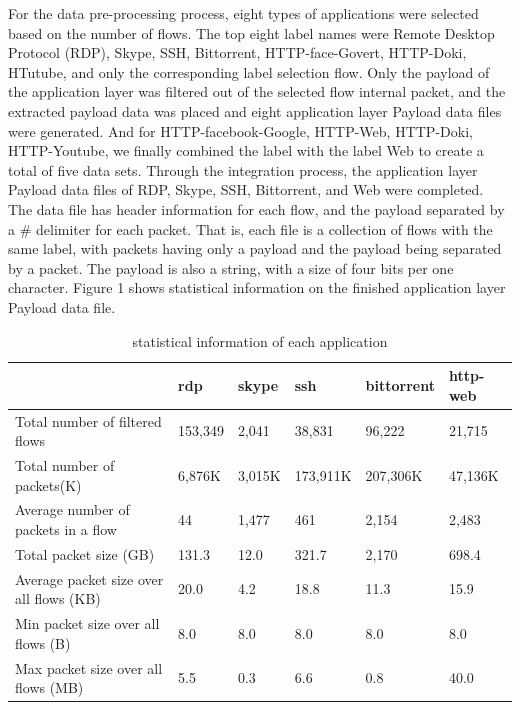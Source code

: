 \documentclass[10pt, twoside, jounal]{IEEEtran}
\begin{document}
For the data pre-processing process, eight types of applications were selected based on the number of flows. The top eight label names were Remote Desktop Protocol (RDP), Skype, SSH, Bittorrent, HTTP-face-Govert, HTTP-Doki, HTutube, and only the corresponding label selection flow.
Only the payload of the application layer was filtered out of the selected flow internal packet, and the extracted payload data was placed  and eight application layer Payload data files were generated. And for HTTP-facebook-Google, HTTP-Web, HTTP-Doki, HTTP-Youtube, we finally combined the label with the label Web to create a total of five data sets.
Through the integration process, the application layer Payload data files of RDP, Skype, SSH, Bittorrent, and Web were completed.
The data file has header information for each flow, and the payload separated by a $\#$ delimiter for each packet.
That is, each file is a collection of flows with the same label, with packets having only a payload and the payload being separated by a packet. The payload is also a string, with a size of four bits per one character. Figure 1 shows statistical information on the finished application layer Payload data file.

\begin{table}
\caption{statistical information of each application}
\setlength{\tabcolsep}{3pt}
\begin{tabular}{|p{65pt}|p{31pt}|p{31pt}|p{31pt}|p{31pt}|p{31pt}|}
\hline
 & rdp & skype & ssh & bittorrent & http-web \\ 
\hline
\hline
Total number of filtered flows & 153,349 & 2,041 & 38,831 & 96,222 & 21,715 \\ 
\hline
Total number of packets(K) & 6,876K & 3,015K & 173,911K & 207,306K & 47,136K \\ 
\hline
Average number of packets in a flow & 44 & 1,477 & 461 & 2,154 & 2,483 \\ 
\hline
Total packet size (GB) & 131.3 & 12.0 & 321.7 & 2,170 & 698.4 \\ 
\hline
Average packet size over all flows (KB) & 20.0 & 4.2 & 18.8 & 11.3 & 15.9 \\ 
\hline
Min packet size over all flows (B) & 8.0 & 8.0 & 8.0 & 8.0 & 8.0 \\ 
\hline
Max packet size over all flows (MB) & 5.5 & 0.3 & 6.6 & 0.8 & 40.0 \\ 
\hline
\end{tabular}
\label{tab1}
\end{table}
\end{document}

